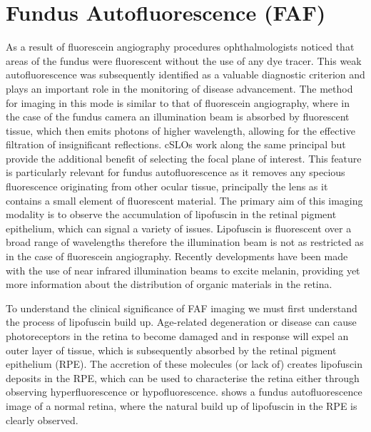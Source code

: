 \section{Fundus Autofluorescence (FAF)}

As a result of fluorescein angiography procedures ophthalmologists noticed
that areas of the fundus were fluorescent without the use of any dye tracer.
This weak autofluorescence was subsequently identified as a valuable diagnostic
criterion and plays an important role in the monitoring of disease advancement.
The method for imaging in this mode is similar to that of fluorescein angiography,
where in the case of the fundus camera an illumination beam is absorbed by
fluorescent tissue, which then emits photons of higher wavelength, allowing
for the effective filtration of insignificant reflections. cSLOs work along
the same principal but provide the additional benefit of selecting the focal
plane of interest.\cite{schmitz2008fundus} This feature is particularly relevant
for fundus autofluorescence as it removes any specious fluorescence originating
from other ocular tissue, principally the lens as it contains a small element of
fluorescent material. \cite{von1995distribution} The primary aim of this imaging
modality is to observe the accumulation of lipofuscin in the retinal pigment
epithelium, which can signal a variety of issues. Lipofuscin is fluorescent over
a broad range of wavelengths therefore the illumination beam is not as restricted
as in the case of fluorescein angiography. Recently developments have been made
with the use of near infrared illumination beams to excite melanin, providing
yet more information about the distribution of organic materials in the retina.

To understand the clinical significance of FAF imaging we must first understand
the process of lipofuscin build up.\cite{kennedy1995lipofuscin} Age-related
degeneration or disease can cause photoreceptors in the retina to become
damaged and in response will expel an outer layer of tissue, which is
subsequently absorbed by the retinal pigment epithelium (RPE).\cite{spaide2003fundus}
The accretion of these molecules (or lack of) creates lipofuscin deposits
in the RPE, which can be used to characterise the retina either through
observing hyperfluorescence or hypofluorescence. shows a
fundus autofluorescence image of a normal retina, where the natural
build up of lipofuscin in the RPE is clearly observed.

